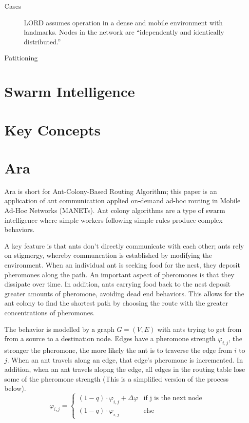 \documentclass[a4paper]{article}
\begin{document}
\begin{description}
	\item[Cases] LORD assumes operation in a dense and mobile environment with landmarks.  Nodes in the network are ``idependently and identically distributed.''  
	\item[Patitioning]   
\end{description}


\section{Swarm Intelligence}

\section{Key Concepts}

\section{Ara}
Ara \cite{ara-ants} is short for Ant-Colony-Based Routing Algorithm; this paper is an application of ant communication applied on-demand ad-hoc routing in Mobile Ad-Hoc Networks (MANETs).
Ant colony algorithms are a type of swarm intelligence where simple workers following simple rules produce complex behaviors.  


A key feature is that ants don't directly communicate with each other; ants rely on stigmergy, whereby communcation is established by modifying the environment.
When an individual ant is seeking food for the nest, they deposit pheromones along the path.  An important aspect of pheromones is that they dissipate over time.  In addition, ants carrying food back to the nest deposit greater amounts of pheromone, avoiding dead end behaviors.  This allows for the ant colony to find the shortest path by choosing the route with the greater concentrations of pheromones. 

The behavior is modelled by a graph $G = (V, E)$ with ants trying to get from from a source to a destination node. Edges have a pheromone strength $\varphi_{i,j}$, the stronger the pheromone, the more likely the ant is to traverse the edge from $i$ to $j$.  When an ant travels along an edge, that edge's pheromone is incremented.  In addition, when an ant travels alopng the edge, all edges in the routing table lose some of the pheromone strength (This is a simplified version of the process below).
\[
\varphi_{i,j} =
\begin{cases}
    (1-q) \cdot \varphi_{i,j} + \Delta\varphi & \text{if j is the next node}  \\
    (1-q) \cdot \varphi_{i,j}       & \text{else}
\end{cases}
\]
\end{document}
